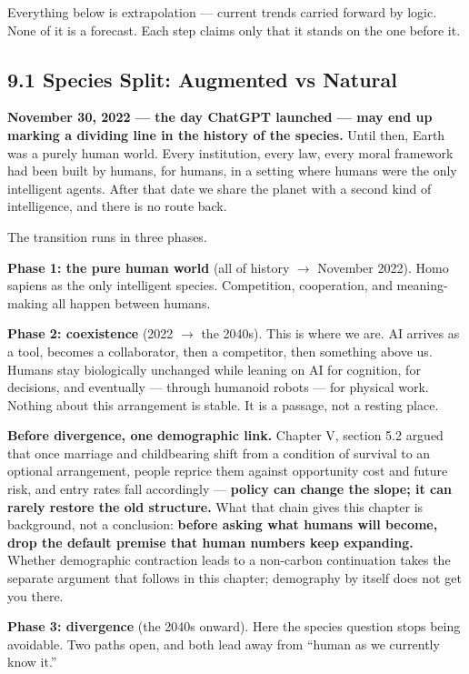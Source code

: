 \documentclass[11pt,a4paper]{article}
\begin{document}
Everything below is extrapolation --- current trends carried forward by logic. None of it is a forecast. Each step claims only that it stands on the one before it.

\subsection{9.1 Species Split: Augmented vs Natural}

\textbf{November 30, 2022 --- the day ChatGPT launched --- may end up marking a dividing line in the history of the species.} Until then, Earth was a purely human world. Every institution, every law, every moral framework had been built by humans, for humans, in a setting where humans were the only intelligent agents. After that date we share the planet with a second kind of intelligence, and there is no route back.

The transition runs in three phases.

\textbf{Phase 1: the pure human world} (all of history $\to$ November 2022). Homo sapiens as the only intelligent species. Competition, cooperation, and meaning-making all happen between humans.

\textbf{Phase 2: coexistence} (2022 $\to$ the 2040s). This is where we are. AI arrives as a tool, becomes a collaborator, then a competitor, then something above us. Humans stay biologically unchanged while leaning on AI for cognition, for decisions, and eventually --- through humanoid robots --- for physical work. Nothing about this arrangement is stable. It is a passage, not a resting place.

\textbf{Before divergence, one demographic link.} Chapter V, section 5.2 argued that once marriage and childbearing shift from a condition of survival to an optional arrangement, people reprice them against opportunity cost and future risk, and entry rates fall accordingly --- \textbf{policy can change the slope; it can rarely restore the old structure.} What that chain gives this chapter is background, not a conclusion: \textbf{before asking what humans will become, drop the default premise that human numbers keep expanding.} Whether demographic contraction leads to a non-carbon continuation takes the separate argument that follows in this chapter; demography by itself does not get you there.

\textbf{Phase 3: divergence} (the 2040s onward). Here the species question stops being avoidable. Two paths open, and both lead away from ``human as we currently know it.''
\end{document}
